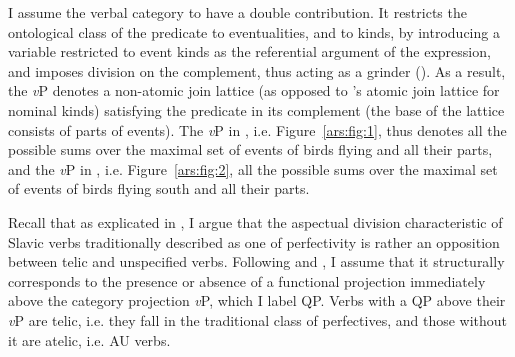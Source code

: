 \documentclass[output=paper]{langscibook}
\begin{document}
      \begin{figure}
      \begin{floatrow}
      \captionsetup{margin=.05\linewidth}
     \end{floatrow}
     \end{figure}

I assume the verbal category to have a double contribution. It restricts the ontological class of the predicate to eventualities, and to kinds, by introducing a variable restricted to event kinds as the referential argument of the expression, and imposes division on the complement, thus acting as a grinder (\citealt{Pelletier.1975}). As a result, the \textit{v}P denotes a non-atomic join lattice (as opposed to \citeauthor{Chierchia1998}'s \citeyear{Chierchia1998} atomic join lattice for nominal kinds) satisfying the predicate in its complement (the base of the lattice consists of parts of events). The \textit{v}P in , i.e. Figure~\ref{ars:fig:1}, thus denotes all the possible sums over the maximal set of events of birds flying and all their parts, and the \textit{v}P in , i.e. Figure~\ref{ars:fig:2}, all the possible sums over the maximal set of events of birds flying south and all their parts.

Recall that as explicated in , I argue that the aspectual division characteristic of Slavic verbs traditionally described as one of perfectivity is rather an opposition between telic and unspecified verbs. Following \citet{Borer.2005} and \citet{Lazor.2010}, I assume that it structurally corresponds to the presence or absence of a functional projection immediately above the category projection \textit{v}P, which I label QP. Verbs with a QP above their \textit{v}P are telic, i.e. they fall in the traditional class of perfectives, and those without it are atelic, i.e. AU verbs.
\end{document}
